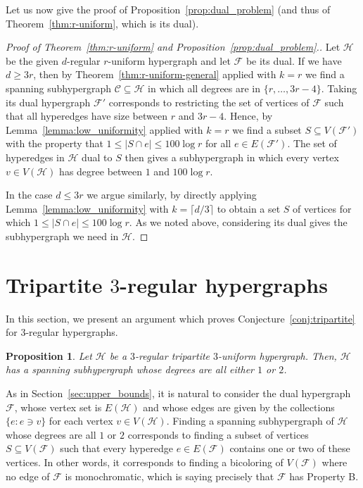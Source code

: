 \documentclass[11pt, a4paper]{article}
\numberwithin{theorem}{section} %
\newtheorem{proposition}[theorem]{Proposition}
\theoremstyle{remark}
\theoremstyle{definition}
\def\cC{\mathcal{C}}
\def\cF{\mathcal{F}}
\def\cH{\mathcal{H}}
\begin{document}
Let us now give the proof of Proposition~\ref{prop:dual_problem} (and thus of Theorem~\ref{thm:r-uniform}, which is its dual).

\begin{proof}[Proof of Theorem~\ref{thm:r-uniform} and Proposition~\ref{prop:dual_problem}.]
Let $\cH$ be the given $d$-regular $r$-uniform hypergraph and let $\cF$ be its dual. If we have $d\geq 3r$, then by Theorem~\ref{thm:r-uniform-general} applied with $k=r$ we find a spanning subhypergraph $\cC\subseteq \cH$ in which all degrees are in $\{r, \dots, 3r-4\}$. Taking its dual hypergraph $\cF'$ corresponds to restricting the set of vertices of $\cF$ such that all hyperedges have size between $r$ and $3r-4$. Hence, by Lemma~\ref{lemma:low_uniformity} applied with $k=r$ we find a subset $S\subseteq V(\cF')$ with the property that $1\leq |S\cap e|\leq 100\log r$ for all $e\in E(\cF')$. The set of hyperedges in $\cH$ dual to $S$ then gives a subhypergraph in which every vertex $v\in V(\cH)$ has degree between $1$ and $100\log r$.

In the case $d\leq 3r$ we argue similarly, by directly applying Lemma~\ref{lemma:low_uniformity} with $k=\lceil d/3\rceil$ to obtain a set $S$ of vertices for which $1\leq |S\cap e|\leq 100\log r$. As we noted above, considering its dual gives the subhypergraph we need in $\cH$.
\end{proof}


\section{Tripartite $3$-regular hypergraphs}\label{sec:tripartite}

In this section, we present an argument which proves Conjecture~\ref{conj:tripartite} for $3$-regular hypergraphs.

\begin{proposition}\label{prop:2-shallow}
Let $\cH$ be a $3$-regular tripartite $3$-uniform hypergraph. Then, $\cH$ has a spanning subhypergraph whose degrees are all either $1$ or $2$.
\end{proposition}

As in Section~\ref{sec:upper_bounds}, it is natural to consider the dual hypergraph $\cF$, whose vertex set is $E(\cH)$ and whose edges are given by the collections $\{e: e\ni v\}$ for each vertex $v\in V(\cH)$. Finding a spanning subhypergraph of $\cH$ whose degrees are all $1$ or $2$ corresponds to finding a subset of vertices $S\subseteq V(\cF)$ such that every hyperedge $e\in E(\cF)$ contains one or two of these vertices. In other words, it corresponds to finding a bicoloring of $V(\cF)$ where no edge of $\cF$ is monochromatic, which is saying precisely that $\cF$ has Property B.
\end{document}
